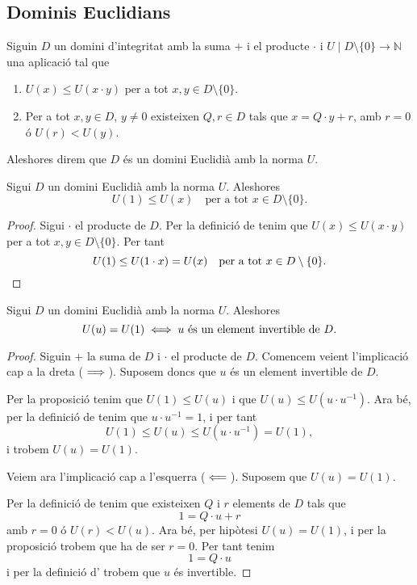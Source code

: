 \documentclass[../Apunts.tex]{subfiles}
\begin{document}
	\subsection{Dominis Euclidians}
	\begin{definition}
		\label{def:domini Euclidià}
		\label{def:DE}
		Siguin \(D\) un domini d'integritat amb la suma \(+\) i el producte \(\cdot\) i \(U\mid D\setminus\{0\}\longrightarrow\mathbb{N}\) una aplicació tal que
		\begin{enumerate}
			\item \(U(x)\leq U(x\cdot y)\) per a tot \(x,y\in D\setminus\{0\}\).
			\item Per a tot \(x,y\in D\), \(y\neq0\) existeixen \(Q,r\in D\) tals que \(x=Q\cdot y+r\), amb \(r=0\) ó \(U(r)<U(y)\).
		\end{enumerate}
		Aleshores direm que \(D\) és un domini Euclidià amb la norma \(U\).
	\end{definition}
	\begin{proposition}
		\label{prop:norma de 1 és la més petita en DE}
		Sigui \(D\) un domini Euclidià amb la norma \(U\). Aleshores
		\[U(1)\leq U(x)\quad\text{per a tot }x\in D\setminus\{0\}.\]
		\begin{proof}
			Sigui \(\cdot\) el producte de \(D\). Per la definició de  tenim que \(U(x)\leq U(x\cdot y)\) per a tot \(x,y\in D\setminus\{0\}\). Per tant
			\[U(1)\leq U(1\cdot x)=U(x)\quad\text{per a tot }x\in D\setminus\{0\}.\qedhere\]
		\end{proof}
	\end{proposition}
	\begin{proposition}
		Sigui \(D\) un domini Euclidià amb la norma \(U\). Aleshores
		\[U(u)=U(1)\iff u\text{ és un element invertible de }D.\]
		\begin{proof}			
			Siguin \(+\) la suma de \(D\) i \(\cdot\) el producte de \(D\). Comencem veient l'implicació cap a la dreta (\(\implies\)). Suposem doncs que \(u\) és un element invertible de \(D\).
			
			Per la proposició  tenim que \(U(1)\leq U(u)\) i que \(U(u)\leq U(u\cdot u^{-1})\). Ara bé, per la definició de  tenim que \(u\cdot u^{-1}=1\), i per tant
			\[U(1)\leq U(u)\leq U(u\cdot u^{-1})=U(1),\]
			i trobem \(U(u)=U(1)\).
			
			Veiem ara l'implicació cap a l'esquerra (\(\impliedby\)). Suposem que \(U(u)=U(1)\).
			
			Per la definició de  tenim que existeixen \(Q\) i \(r\) elements de \(D\) tals que
			\[1=Q\cdot u+r\]
			amb \(r=0\) ó \(U(r)<U(u)\). Ara bé, per hipòtesi \(U(u)=U(1)\), i per la proposició  trobem que ha de ser \(r=0\). Per tant tenim
			\[1=Q\cdot u\]
			i per la definició d' trobem que \(u\) és invertible.
		\end{proof}
	\end{proposition}
\end{document}
